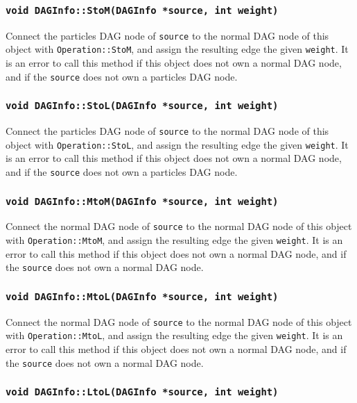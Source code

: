 \subsubsection{\texttt{void DAGInfo::StoM(DAGInfo *source, int weight)}}

Connect the particles DAG node of \texttt{source} to the normal DAG node of
this object with \texttt{Operation::StoM}, and assign the resulting edge the
given \texttt{weight}. It is an error to call this method if this object does
not own a normal DAG node, and if the \texttt{source} does not own a particles
DAG node.

\subsubsection{\texttt{void DAGInfo::StoL(DAGInfo *source, int weight)}}

Connect the particles DAG node of \texttt{source} to the normal DAG node of
this object with \texttt{Operation::StoL}, and assign the resulting edge the
given \texttt{weight}. It is an error to call this method if this object does
not own a normal DAG node, and if the \texttt{source} does not own a particles
DAG node.

\subsubsection{\texttt{void DAGInfo::MtoM(DAGInfo *source, int weight)}}

Connect the normal DAG node of \texttt{source} to the normal DAG node of
this object with \texttt{Operation::MtoM}, and assign the resulting edge the
given \texttt{weight}. It is an error to call this method if this object does
not own a normal DAG node, and if the \texttt{source} does not own a normal
DAG node.

\subsubsection{\texttt{void DAGInfo::MtoL(DAGInfo *source, int weight)}}

Connect the normal DAG node of \texttt{source} to the normal DAG node of
this object with \texttt{Operation::MtoL}, and assign the resulting edge the
given \texttt{weight}. It is an error to call this method if this object does
not own a normal DAG node, and if the \texttt{source} does not own a normal
DAG node.

\subsubsection{\texttt{void DAGInfo::LtoL(DAGInfo *source, int weight)}}

